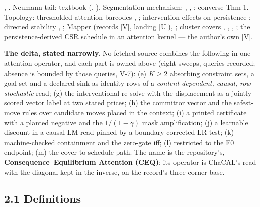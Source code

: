 \documentclass[11pt,a4paper]{article}
\theoremstyle{plain}
\theoremstyle{definition}
\theoremstyle{remark}
\begin{document}
\citep{vakalis-2026-interventiongap}, \citep{lin-2026-scratchworld}.
Neumann tail: textbook (\citep{meyer-2000-matrix},
\citep{horn-2013-matrix}). Segmentation mechanism:
\citep{lin-2025-forgetting-transformer}, \citep{yang-2023-gla},
\citep{hwang-2025-hnet}; converse \citep{yang-2026-boundary-repair} Thm
1. Topology: thresholded attention barcodes
\citep{kushnareva-2021-tda-attention}, \citep{kushnareva-2022-betti};
intervention effects on persistence \citep{kim-2026-topological-causal};
directed stability \citep{turner-2019-quasimetric-rips},
\citep{chowdhury-2017-path-homology}; Mapper \citep{singh-2007-mapper}
(records {[}V{]}, landing {[}U{]}),
\citep{carriere-2018-mapper-statistics}; cluster covers
\citep{cho-2022-sbm-attention}, \citep{roy-2021-routing-transformer},
\citep{kitaev-2020-reformer}, \citep{yuan-2025-nsa}; the
persistence-derived CSR schedule in an attention kernel --- the author's
own \citep{sharma-2026-kernels-22} {[}V{]}.

\textbf{The delta, stated narrowly.} No fetched source combines the
following in one attention operator, and each part is owned above (eight
sweeps, queries recorded; absence is bounded by those queries, V-7): (e)
\(K\ge2\) absorbing constraint sets, a goal set and a declared sink as
identity rows of a \emph{content-dependent, causal, row-stochastic}
read; (g) the interventional re-solve with the displacement as a jointly
scored vector label at two stated prices; (h) the committor vector and
the safest-move rules over candidate moves placed in the context; (i) a
printed certificate with a planted negative and the \(1/(1-\gamma)\)
mask amplification; (j) a learnable discount in a causal LM read pinned
by a boundary-corrected LR test; (k) machine-checked containment and the
zero-gate iff; (l) restricted to the F0 endpoint; (m) the
cover-to-schedule path. The name is the repository's,
\textbf{Consequence--Equilibrium Attention (CEQ)}; its operator is
ChaCAL's read with the diagonal kept in the inverse, on the record's
three-corner base.

\subsection{2.1 Definitions}\label{definitions}
\end{document}
